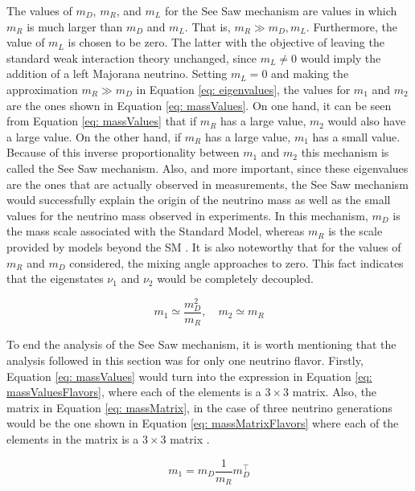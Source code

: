 The values of $m_{D}$, $m_{R}$, and $m_{L}$ for the See Saw mechanism are values in which $m_{R}$ is much larger than $m_{D}$ and $m_{L}$. That is, $m_{R} \gg m_{D}, m_{L}$. Furthermore, the value of $m_{L}$ is chosen to be zero. The latter with the objective of leaving the standard weak interaction theory unchanged, since $m_{L} \neq 0$ would imply the addition of a left Majorana neutrino. Setting $m_{L} = 0$ and making the approximation $m_{R} \gg m_{D}$ in Equation \ref{eq: eigenvalues}, the values for $m_{1}$ and $m_{2}$ are the ones shown in Equation \ref{eq: massValues}. On one hand, it can be seen from Equation \ref{eq: massValues} that if $m_{R}$ has a large value, $m_{2}$ would also have a large value. On the other hand, if $m_{R}$ has a large value, $m_{1}$ has a small value. Because of this inverse proportionality between $m_{1}$ and $m_{2}$ this mechanism is called the See Saw mechanism. Also, and more important, since these eigenvalues are the ones that are actually observed in measurements, the See Saw mechanism would successfully explain the origin of the neutrino mass as well as the small values for the neutrino mass observed in experiments. In this mechanism, $m_{D}$ is the mass scale associated with the Standard Model, whereas $m_{R}$ is the scale provided by models beyond the SM \cite{NeutrinoMass}. It is also noteworthy that for the values of $m_{R}$ and $m_{D}$ considered, the mixing angle approaches to zero. This fact indicates that the eigenstates $\nu_{1}$ and $\nu_{2}$ would be completely decoupled.

\begin{equation}\label{eq: massValues}
m_{1} \simeq \frac{m_{D}^{2}}{m_{R}}, \quad m_{2} \simeq m_{R}
\end{equation}

To end the analysis of the See Saw mechanism, it is worth mentioning that the analysis followed in this section was for only one neutrino flavor. Firstly, Equation \ref{eq: massValues} would turn into the expression in Equation \ref{eq: massValuesFlavors}, where each of the elements is a $3 \times 3$ matrix. Also, the matrix in Equation \ref{eq: massMatrix}, in the case of three neutrino generations would be the one shown in Equation \ref{eq: massMatrixFlavors} where each of the elements in the matrix is a $3 \times 3$ matrix \cite{NeutrinoMass}. 


\begin{equation}\label{eq: massValuesFlavors}
m_{1} = m_{D}\frac{1}{m_{R}}m_{D}^{\intercal}
\end{equation}

